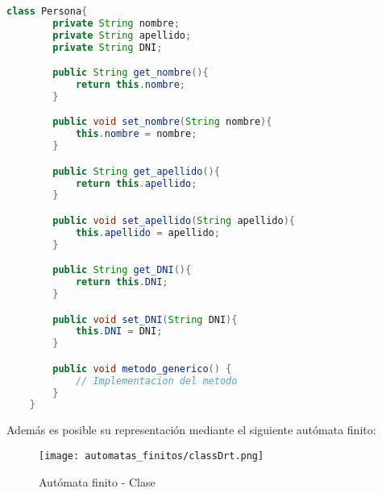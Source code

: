 \begin{lstlisting}[caption={Java - Resultado obtenido de la generación de
\texttt{Fragmento \ref{lst:drt_java_clase}}}, language=Java, basicstyle=\footnotesize\ttfamily]
	class Persona{
		private String nombre;
		private String apellido;
		private String DNI;

		public String get_nombre(){
			return this.nombre;
		}

		public void set_nombre(String nombre){
			this.nombre = nombre;
		}

		public String get_apellido(){
			return this.apellido;
		}

		public void set_apellido(String apellido){
			this.apellido = apellido;
		}

		public String get_DNI(){
			return this.DNI;
		}

		public void set_DNI(String DNI){
			this.DNI = DNI;
		}

		public void metodo_generico() {
			// Implementacion del metodo
		}
	}
\end{lstlisting}

Además es posible su representación mediante el siguiente autómata finito:

\begin{figure}[H]
	\centering
	\texttt{[image: automatas\_finitos/classDrt.png]}
	\caption{Autómata finito - Clase}
	\label{fig:af_clase}
\end{figure}
